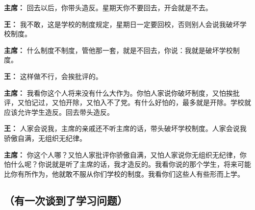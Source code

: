 \begin{list}{}
\item[\textbf{主席：}] 回去以后，你带头造反。星期天你不要回去，开会就是不去。

\item[\textbf{王：}] 我不敢，这是学校的制度规定，星期日一定要回校，否则别人会说我破坏学校制度。

\item[\textbf{主席：}] 什么制度不制度，管他那一套，就是不回去，你说：我就是破坏学校制度。

\item[\textbf{王：}] 这样做不行，会挨批评的。

\item[\textbf{主席：}] 我看你这个人将来没有什么大作为。你怕人家说你破坏制度，又怕挨批评，又怕记过，又怕开除，又怕入不了党。有什么好怕的，最多就是开除。学校就应该允许学生造反。回去带头造反。

\item[\textbf{王：}] 人家会说我，主席的亲戚还不听主席的话，带头破坏学校制度。人家会说我骄傲自满，无组织无纪律。

\item[\textbf{主席：}] 你这个人哪？又怕人家批评你骄傲自满，又怕人家说你无组织无纪律，你怕什么呢？你说就是听了主席的话，我才造反的。我看你说的那个学生，将来可能比你有所作为，他就敢不服从你们学校的制度。我看你们这些人有些形而上学。

\end{list}

\subsection{（有一次谈到了学习问题）}

